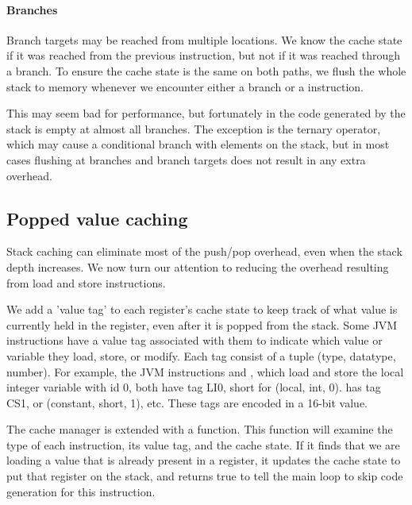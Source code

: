 \paragraph{Branches} Branch targets may be reached from multiple locations. We know the cache state if it was reached from the previous instruction, but not if it was reached through a branch. To ensure the cache state is the same on both paths, we flush the whole stack to memory whenever we encounter either a branch or a  instruction. 

This may seem bad for performance, but fortunately in the code generated by  the stack is empty at almost all branches. The exception is the ternary  \mycode{:} operator, which may cause a conditional branch with elements on the stack, but in most cases flushing at branches and branch targets does not result in any extra overhead.

\subsection{Popped value caching}
\label{sec-optimisations-popped-value-caching}
Stack caching can eliminate most of the push/pop overhead, even when the stack depth increases. We now turn our attention to reducing the overhead resulting from load and store instructions.



We add a 'value tag' to each register's cache state to keep track of what value is currently held in the register, even after it is popped from the stack. Some JVM instructions have a value tag associated with them to indicate which value or variable they load, store, or modify. Each tag consist of a tuple (type, datatype, number). For example, the JVM instructions  and , which load and store the local integer variable with id 0, both have tag LI0, short for (local, int, 0).  has tag CS1, or (constant, short, 1), etc. These tags are encoded in a 16-bit value.

The cache manager is extended with a  function. This function will examine the type of each instruction, its value tag, and the cache state. If it finds that we are loading a value that is already present in a register, it updates the cache state to put that register on the stack, and returns true to tell the main loop to skip code generation for this instruction.

